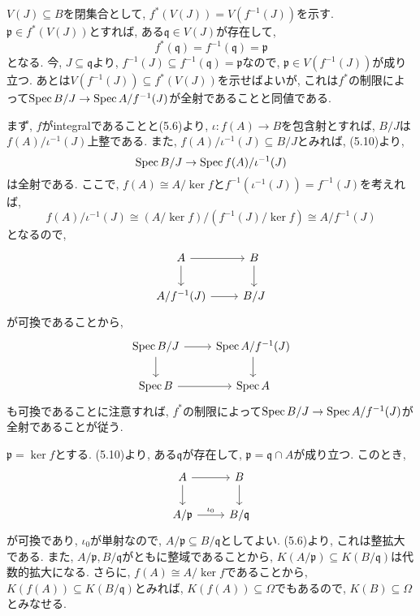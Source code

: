 \documentclass[dvipdfmx]{jsarticle}
\begin{document}
    \begin{problem}
        $V(J) \subseteq B$を閉集合として, $f^\ast(V(J)) = V(f^{-1}(J))$を示す.
        $\mathfrak{p} \in f^{\ast}(V(J))$とすれば, ある$\mathfrak{q} \in V(J)$が存在して,
        \[
            f^{\ast}(\mathfrak{q}) = f^{-1}(\mathfrak{q}) = \mathfrak{p}
        \]
        となる.
        今, $J \subseteq \mathfrak{q}$より, $f^{-1}(J) \subseteq f^{-1}(\mathfrak{q}) = \mathfrak{p}$なので,
        $\mathfrak{p} \in V(f^{-1}(J))$が成り立つ.
        あとは$V(f^{-1}(J)) \subseteq f^{\ast}(V(J))$を示せばよいが,
        これは$f^{\ast}$の制限によって$\operatorname{Spec}{B/J} \to \operatorname{Spec}{A/f^{-1}(J)}$が全射であることと同値である.

        まず, $f$がintegralであることと(5.6)より, $\iota: f(A) \to B$を包含射とすれば,
        $B/J$は$f(A)/\iota^{-1}(J)$上整である.
        また, $f(A)/\iota^{-1}(J) \subseteq B/J$とみれば, (5.10)より,
        \[
            \operatorname{Spec}{B/J} \to \operatorname{Spec}{f(A)/\iota^{-1}(J)}
        \]
        は全射である.
        ここで, $f(A) \cong A/\ker{f}$と$f^{-1}(\iota^{-1}(J)) = f^{-1}(J)$を考えれば,
        \[
            f(A)/\iota^{-1}(J) \cong (A/\ker{f})/(f^{-1}(J)/\ker{f}) \cong A/f^{-1}(J)
        \]
        となるので,
        \[
            \begin{tikzcd}
                A \arrow[r]\arrow[d] & B  \arrow[d] \\
                A/f^{-1}(J) \arrow[r] &  B/J
            \end{tikzcd}
        \]
        が可換であることから,
        \[
            \begin{tikzcd}
                \Spec{B/J} \arrow[r]\arrow[d] & \Spec{A/f^{-1}(J)}   \arrow[d] \\
                \Spec{B} \arrow[r] & \Spec{A}
            \end{tikzcd}
        \]
        も可換であることに注意すれば,
        $f^{\ast}$の制限によって$\operatorname{Spec}{B/J} \to \operatorname{Spec}{A/f^{-1}(J)}$が全射であることが従う.
    \end{problem}

    \begin{problem}
        $\mathfrak{p} = \ker{f}$とする.
        (5.10)より, ある$\mathfrak{q}$が存在して, $\mathfrak{p} = \mathfrak{q} \cap A$が成り立つ.
        このとき,
        \[
            \begin{tikzcd}
                A \arrow[r]\arrow[d] & B  \arrow[d] \\
                A/\mathfrak{p} \arrow[r, "\iota_0"] &  B/\mathfrak{q}
            \end{tikzcd}
        \]
        が可換であり, $\iota_0$が単射なので, $A/\mathfrak{p} \subseteq B/\mathfrak{q}$としてよい.
        (5.6)より, これは整拡大である.
        また, $A/\mathfrak{p}, B/\mathfrak{q}$がともに整域であることから,
        $K(A/\mathfrak{p}) \subseteq K(B/\mathfrak{q})$は代数的拡大になる.
        さらに, $f(A) \cong A/\ker{f}$であることから, $K(f(A)) \subseteq K(B/\mathfrak{q})$とみれば,
        $K(f(A)) \subseteq \Omega$でもあるので, $K(B) \subseteq \Omega$とみなせる.
    \end{problem}
\end{document}
